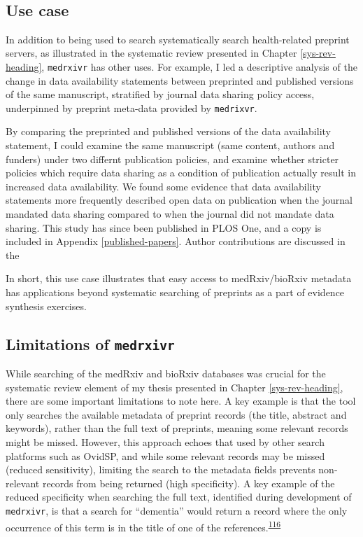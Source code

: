 \documentclass[a4paper, twoside]{templates/ociamthesis}
\begin{document}
~

\hypertarget{use-case}{%
\subsection{Use case}\label{use-case}}

In addition to being used to search systematically search health-related preprint servers, as illustrated in the systematic review presented in Chapter \ref{sys-rev-heading}, \texttt{medrxivr} has other uses. For example, I led a descriptive analysis of the change in data availability statements between preprinted and published versions of the same manuscript, stratified by journal data sharing policy access, underpinned by preprint meta-data provided by \texttt{medrixvr}.

By comparing the preprinted and published versions of the data availability statement, I could examine the same manuscript (same content, authors and funders) under two differnt publication policies, and examine whether stricter policies which require data sharing as a condition of publication actually result in increased data availability. We found some evidence that data availability statements more frequently described open data on publication when the journal mandated data sharing compared to when the journal did not mandate data sharing. This study has since been published in PLOS One, and a copy is included in Appendix \ref{published-papers}. Author contributions are discussed in the

In short, this use case illustrates that easy access to medRxiv/bioRxiv metadata has applications beyond systematic searching of preprints as a part of evidence synthesis exercises.

\hypertarget{limitations-of-medrxivr}{%
\subsection{\texorpdfstring{Limitations of \texttt{medrxivr}}{Limitations of medrxivr}}\label{limitations-of-medrxivr}}

While searching of the medRxiv and bioRxiv databases was crucial for the systematic review element of my thesis presented in Chapter \ref{sys-rev-heading}, there are some important limitations to note here. A key example is that the tool only searches the available metadata of preprint records (the title, abstract and keywords), rather than the full text of preprints, meaning some relevant records might be missed. However, this approach echoes that used by other search platforms such as OvidSP, and while some relevant records may be missed (reduced sensitivity), limiting the search to the metadata fields prevents non-relevant records from being returned (high specificity). A key example of the reduced specificity when searching the full text, identified during development of \texttt{medrxivr}, is that a search for ``dementia'' would return a record where the only occurrence of this term is in the title of one of the references.\textsuperscript{\protect\hyperlink{ref-bong2019}{116}}
\end{document}
